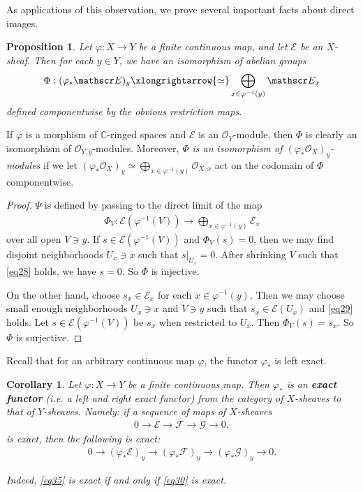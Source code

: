 \documentclass[12pt,b5paper,notitlepage]{report}
\theoremstyle{definition}
\theoremstyle{plain}
\newtheorem{pp}[df]{Proposition}
\newtheorem{co}[df]{Corollary}
\newcommand{\scr}{\mathscr}
\newcommand{\Cbb}{\mathbb C}
\numberwithin{equation}{section}
\begin{document}
As applications of this observation, we prove several important facts about direct images.

\begin{pp}\label{lb56}
Let $\varphi:X\rightarrow Y$ be a finite continuous map, and let $\scr E$ be an $X$-sheaf. Then for each $y\in Y$, we have an isomorphism of abelian groups
\begin{align}\label{eq27}
\Phi:(\varphi_*\scr E)_y\xlongrightarrow{\simeq} \bigoplus_{x\in\varphi^{-1}(y)}\scr E_x
\end{align}
defined componentwise by the obvious restriction maps.
\end{pp}
If $\varphi$ is a morphism of $\Cbb$-ringed spaces and $\scr E$ is an $\scr O_Y$-module, then $\Phi$ is clearly an isomorphism of $\scr O_{Y,y}$-modules. Moreover, \textit{$\Phi$ is an isomorphism of $(\varphi_*\scr O_X)_y$-modules} if we let $(\varphi_*\scr O_X)_y\simeq\bigoplus_{x\in\varphi^{-1}(y)}\scr O_{X,x}$ act on the codomain of $\Phi$ componentwise.

\begin{proof}
$\Psi$ is defined by passing to the direct limit of the map
\begin{align}
\Phi_V:\scr E(\varphi^{-1}(V))\rightarrow\bigoplus_{x\in\varphi^{-1}(y)}\scr E_x
\end{align}
over all open $V\ni y$. If $s\in\scr E(\varphi^{-1}(V))$ and $\Phi_V(s)=0$, then we may find disjoint neighborhoods $U_x\ni x$ such that $s|_{U_x}=0$. After shrinking $V$ such that \eqref{eq28} holds, we have $s=0$. So $\Phi$ is injective.

On the other hand, choose $s_x\in\scr E_x$ for each $x\in\varphi^{-1}(y)$. Then we may choose small enough neighborhoods $U_x\ni x$ and $V\ni y$ such that $s_x\in\scr E(U_x)$ and \eqref{eq29} holds. Let $s\in\scr E(\varphi^{-1}(V))$ be $s_x$ when restricted to $U_x$. Then $\Phi_V(s)=s_x$. So $\Phi$ is surjective.
\end{proof}

Recall that for an arbitrary continuous map $\varphi$, the functor $\varphi_*$ is left exact.

\begin{co}\label{lb71}
Let $\varphi:X\rightarrow Y$ be a finite continuous map. Then $\varphi_*$ is an \textbf{exact functor} (i.e. a left and right exact functor) from the category of $X$-sheaves to that of $Y$-sheaves.  Namely: if a sequence of maps of $X$-sheaves
\begin{align}
0\rightarrow\scr E\rightarrow\scr F\rightarrow\scr G\rightarrow0,\label{eq35}
\end{align}
is exact, then the following is exact:
\begin{align}
0\rightarrow(\varphi_*\scr E)_y\rightarrow(\varphi_*\scr F)_y\rightarrow(\varphi_*\scr G)_y\rightarrow0.\label{eq30}
\end{align}


Indeed, \eqref{eq35} is exact if and only if \eqref{eq30} is exact.
\end{co}
\end{document}
